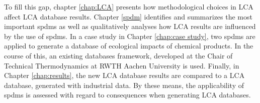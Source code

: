 To fill this gap, chapter \ref{chap:LCA} presents how methodological choices in LCA affect LCA database results. Chapter \ref{spdm} identifies and summarizes the most important \aclp{spdm} as well as qualitatively analyses how  LCA results are influenced by the use of \aclp{spdm}. In a case study in Chapter \ref{chap:case study}, two \aclp{spdm} are applied to generate a database of ecological impacts of chemical products. In the course of this,  an existing databases framework, developed at the Chair of Technical Thermodynamics at RWTH Aachen University is used. Finally, in Chapter \ref{chap:results}, the new \ac{LCA} database results are compared to a \ac{LCA} database, generated with industrial data. By these means, the applicability of \aclp{spdm} is assessed with regard to consequences when generating \ac{LCA} databases.